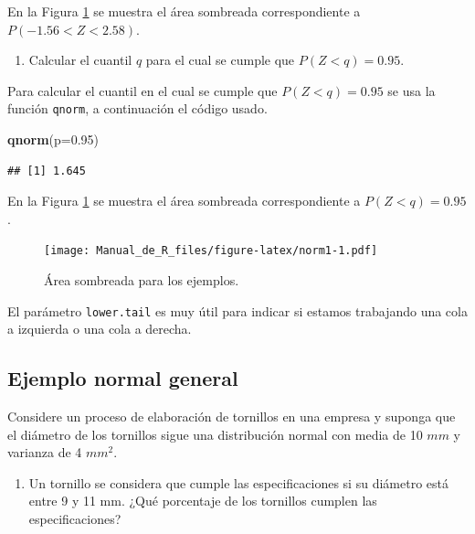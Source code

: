 \documentclass[10pt,]{krantz}
\makeatletter
\newenvironment{Shaded}{\begin{snugshade}}{\end{snugshade}}
\newcommand{\KeywordTok}[1]{\textcolor[rgb]{0.13,0.29,0.53}{\textbf{{#1}}}}
\newcommand{\DataTypeTok}[1]{\textcolor[rgb]{0.13,0.29,0.53}{{#1}}}
\newcommand{\FloatTok}[1]{\textcolor[rgb]{0.00,0.00,0.81}{{#1}}}
\newcommand{\NormalTok}[1]{{#1}}
\providecommand{\tightlist}{%
  \setlength{\itemsep}{0pt}\setlength{\parskip}{0pt}}
\newenvironment{kframe}{%
\medskip{}
\setlength{\fboxsep}{.8em}
 \def\at@end@of@kframe{}%
 \ifinner\ifhmode%
  \def\at@end@of@kframe{\end{minipage}}%
  \begin{minipage}{\columnwidth}%
 \fi\fi%
 \def\FrameCommand##1{\hskip\@totalleftmargin \hskip-\fboxsep
 \colorbox{shadecolor}{##1}\hskip-\fboxsep
     \hskip-\linewidth \hskip-\@totalleftmargin \hskip\columnwidth}%
 \MakeFramed {\advance\hsize-\width
   \@totalleftmargin\z@ \linewidth\hsize
   \@setminipage}}%
 {\par\unskip\endMakeFramed%
 \at@end@of@kframe}
\renewenvironment{Shaded}{\begin{kframe}}{\end{kframe}}
\let\BeginKnitrBlock\begin \let\EndKnitrBlock\end
\makeatother
\begin{document}
En la Figura \ref{fig:norm1} se muestra el área sombreada
correspondiente a \(P(-1.56 < Z < 2.58)\).

\begin{enumerate}
\def\labelenumi{\arabic{enumi})}
\setcounter{enumi}{3}
\tightlist
\item
  Calcular el cuantil \(q\) para el cual se cumple que \(P(Z<q)=0.95\).
\end{enumerate}

Para calcular el cuantil en el cual se cumple que \(P(Z<q)=0.95\) se usa
la función \texttt{qnorm}, a continuación el código usado.

\begin{Shaded}
\begin{Highlighting}[]
\KeywordTok{qnorm}\NormalTok{(}\DataTypeTok{p=}\FloatTok{0.95}\NormalTok{) }
\end{Highlighting}
\end{Shaded}

\begin{verbatim}
## [1] 1.645
\end{verbatim}

En la Figura \ref{fig:norm1} se muestra el área sombreada
correspondiente a \(P(Z<q)=0.95\).

\begin{figure}[htbp]
\centering
\texttt{[image: Manual\_de\_R\_files/figure-latex/norm1-1.pdf]}
\caption{\label{fig:norm1}Área sombreada para los ejemplos.}
\end{figure}

\BeginKnitrBlock{rmdtip}
El parámetro \texttt{lower.tail} es muy útil para indicar si estamos
trabajando una cola a izquierda o una cola a derecha.
\EndKnitrBlock{rmdtip}

\subsection*{Ejemplo normal general}\label{ejemplo-normal-general}


Considere un proceso de elaboración de tornillos en una empresa y
suponga que el diámetro de los tornillos sigue una distribución normal
con media de 10 \(mm\) y varianza de 4 \(mm^2\).

\begin{enumerate}
\def\labelenumi{\arabic{enumi})}
\tightlist
\item
  Un tornillo se considera que cumple las especificaciones si su
  diámetro está entre 9 y 11 mm. ¿Qué porcentaje de los tornillos
  cumplen las especificaciones?
\end{enumerate}
\end{document}
